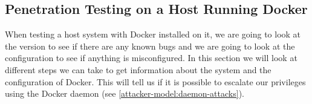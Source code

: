 \subsection{Penetration Testing on a Host Running Docker}\label{subsection:testing-host}
When testing a host system with Docker installed on it, we are going to look at the version to see if there are any known bugs and we are going to look at the configuration to see if anything is misconfigured. In this section we will look at different steps we can take to get information about the system and the configuration of Docker. This will tell us if it is possible to escalate our privileges using the Docker daemon (see \autoref{attacker-model:daemon-attacks}).






